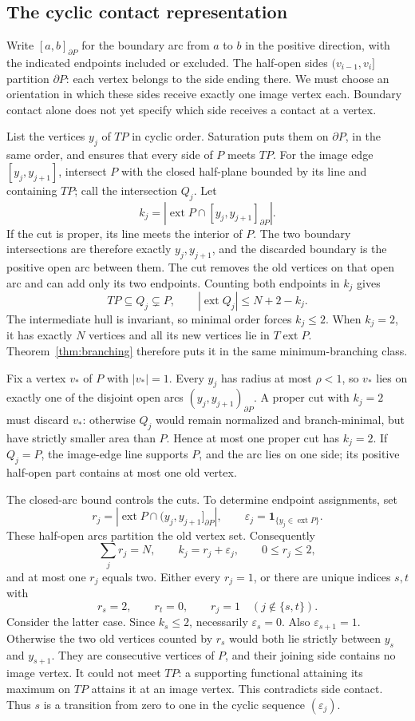 \documentclass[11pt,a4paper]{article}
\DeclareMathOperator{\ext}{ext}
\theoremstyle{definition}
\theoremstyle{remark}
\numberwithin{equation}{section}
\begin{document}
\subsection{The cyclic contact representation}
Write $[a,b]_{\partial P}$ for the boundary arc from $a$ to $b$ in the positive direction, with the indicated endpoints included or excluded. The half-open sides $(v_{i-1},v_i]$ partition $\partial P$: each vertex belongs to the side ending there. We must choose an orientation in which these sides receive exactly one image vertex each. Boundary contact alone does not yet specify which side receives a contact at a vertex.

List the vertices $y_j$ of $TP$ in cyclic order. Saturation puts them on $\partial P$, in the same order, and ensures that every side of $P$ meets $TP$. For the image edge $[y_j,y_{j+1}]$, intersect $P$ with the closed half-plane bounded by its line and containing $TP$; call the intersection $Q_j$. Let
\[
 k_j=|\ext P\cap[y_j,y_{j+1}]_{\partial P}|.
\]
If the cut is proper, its line meets the interior of $P$. The two boundary intersections are therefore exactly $y_j,y_{j+1}$, and the discarded boundary is the positive open arc between them. The cut removes the old vertices on that open arc and can add only its two endpoints. Counting both endpoints in $k_j$ gives
\[
 TP\subseteq Q_j\subsetneq P,\qquad
 |\ext Q_j|\le N+2-k_j.
\]
The intermediate hull is invariant, so minimal order forces $k_j\le2$. When $k_j=2$, it has exactly $N$ vertices and all its new vertices lie in $T\ext P$. Theorem~\ref{thm:branching} therefore puts it in the same minimum-branching class.

Fix a vertex $v_*$ of $P$ with $|v_*|=1$. Every $y_j$ has radius at most $\rho<1$, so $v_*$ lies on exactly one of the disjoint open arcs $(y_j,y_{j+1})_{\partial P}$. A proper cut with $k_j=2$ must discard $v_*$: otherwise $Q_j$ would remain normalized and branch-minimal, but have strictly smaller area than $P$. Hence at most one proper cut has $k_j=2$. If $Q_j=P$, the image-edge line supports $P$, and the arc lies on one side; its positive half-open part contains at most one old vertex.

The closed-arc bound controls the cuts. To determine endpoint assignments, set
\[
 r_j=|\ext P\cap(y_j,y_{j+1}]_{\partial P}|,
 \qquad \varepsilon_j=\mathbf1_{\{y_j\in\ext P\}}.
\]
These half-open arcs partition the old vertex set. Consequently
\[
 \sum_j r_j=N,\qquad k_j=r_j+\varepsilon_j,\qquad 0\le r_j\le2,
\]
and at most one $r_j$ equals two. Either every $r_j=1$, or there are unique indices $s,t$ with
\[
 r_s=2,\qquad r_t=0,\qquad r_j=1\quad(j\notin\{s,t\}).
\]
Consider the latter case. Since $k_s\le2$, necessarily $\varepsilon_s=0$. Also $\varepsilon_{s+1}=1$. Otherwise the two old vertices counted by $r_s$ would both lie strictly between $y_s$ and $y_{s+1}$. They are consecutive vertices of $P$, and their joining side contains no image vertex. It could not meet $TP$: a supporting functional attaining its maximum on $TP$ attains it at an image vertex. This contradicts side contact. Thus $s$ is a transition from zero to one in the cyclic sequence $(\varepsilon_j)$.
\end{document}
